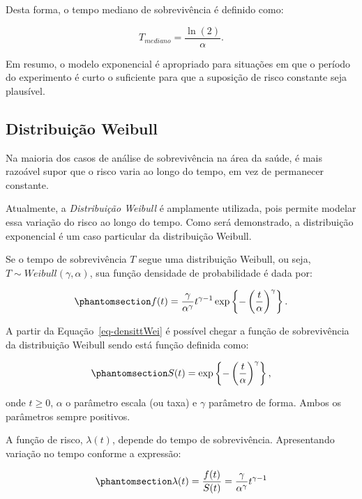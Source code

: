 \documentclass[
  12pt,
  letterpaper,
  DIV=11,
  numbers=noendperiod]{scrreprt}
\begin{document}
Desta forma, o tempo mediano de sobrevivência é definido como:

\[
T_{mediano} = \dfrac{\ln(2)}{\alpha}.
\]

Em resumo, o modelo exponencial é apropriado para situações em que o
período do experimento é curto o suficiente para que a suposição de
risco constante seja plausível.

\subsection{Distribuição Weibull}\label{sec-DistWeibull}

Na maioria dos casos de análise de sobrevivência na área da saúde, é
mais razoável supor que o risco varia ao longo do tempo, em vez de
permanecer constante.

Atualmente, a \emph{Distribuição Weibull} é amplamente utilizada, pois
permite modelar essa variação do risco ao longo do tempo. Como será
demonstrado, a distribuição exponencial é um caso particular da
distribuição Weibull.

Se o tempo de sobrevivência \(T\) segue uma distribuição Weibull, ou
seja, \(T \sim Weibull(\gamma, \alpha)\), sua função densidade de
probabilidade é dada por:

\begin{equation}\phantomsection\label{eq-densittWei}{
f(t) = \dfrac{ \gamma }{ \alpha^{\gamma} } t^{\gamma - 1} \exp \left\{ - \left( \dfrac{t}{\alpha} \right)^{\gamma} \right\}.
}\end{equation}

A partir da Equação~\ref{eq-densittWei} é possível chegar a função de
sobrevivência da distribuição Weibull sendo está função definida como:

\begin{equation}\phantomsection\label{eq-StWeibull}{
S(t) = \exp \left\{ - \left( \dfrac{t}{\alpha} \right)^{\gamma} \right\},
}\end{equation}

onde \(t \geq 0\), \(\alpha\) o parâmetro escala (ou taxa) e \(\gamma\)
parâmetro de forma. Ambos os parâmetros sempre positivos.

A função de risco, \(\lambda(t)\), depende do tempo de sobrevivência.
Apresentando variação no tempo conforme a expressão:

\begin{equation}\phantomsection\label{eq-RiscoWeibull}{
\lambda (t) = \dfrac{f(t)}{S(t)} = \dfrac{ \gamma }{ \alpha^{\gamma} } t^{\gamma - 1}
}\end{equation}
\end{document}
